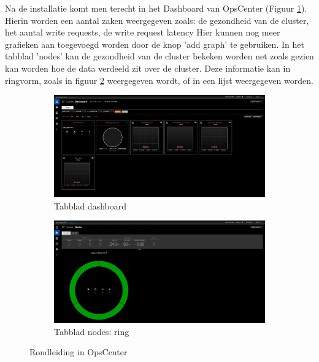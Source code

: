 Na de installatie komt men terecht in het Dashboard van OpsCenter (Figuur \ref{fig:cas_opscenter_tour_dashboard}).
Hierin worden een aantal zaken weergegeven zoals: de gezondheid van de cluster, het aantal write requests, de write request latency\ldot
Hier kunnen nog meer grafieken aan toegevoegd worden door de knop 'add graph' te gebruiken.
In het tabblad 'nodes' kan de gezondheid van de cluster bekeken worden net zoals gezien kan worden hoe de data verdeeld zit over de cluster.
Deze informatie kan in ringvorm, zoals in figuur \ref{fig:cas_opscenter_tour_nodes} weergegeven wordt, of in een lijst weergegeven worden.

\begin{figure}[H]
	\centering
	\begin{subfigure}{.49\textwidth}
		\centering
		\includegraphics[width=.99\linewidth]{img/4_installatie_cassandra/2_Tour_1_Dashboard}
		\caption{Tabblad dashboard}
		\label{fig:cas_opscenter_tour_dashboard}
	\end{subfigure}
	\begin{subfigure}{.49\textwidth}
		\centering
		\includegraphics[width=.99\linewidth]{img/4_installatie_cassandra/2_Tour_2_Nodes}
		\caption{Tabblad nodes: ring}
		\label{fig:cas_opscenter_tour_nodes}
	\end{subfigure}
	\caption{Rondleiding in OpsCenter}
	\label{fig:cas_opscenter_tour}
\end{figure}

